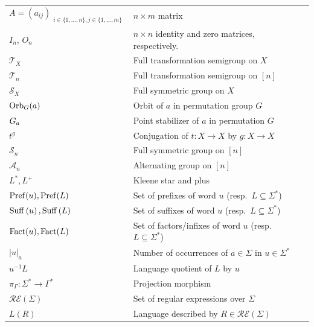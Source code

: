 \begin{longtable}{p{} p{} p{}}
		$A = (a_{ij})_{\substack{i\in \{1,\ldots,n\}, j \in \{1, \ldots, m\}}}$ & $n \times m$ matrix & \pageref{def:matrix} \\	
	$I_n$, $O_n$ & $n \times n$ identity and zero matrices, respectively.  & \pageref{def:identitymtx} \\	
	    $\mathcal T_X$ & Full transformation semigroup on $X$ & \pageref{def:T_X}  \\
	  $\mathcal T_n$ & Full transformation semigroup on $[n]$ & \pageref{def:T_n} \\
	    $\mathcal S_X$ & Full symmetric group on $X$ & \pageref{def:S_X} \\
	$\Orbit{a}{G}$  & Orbit of $a$ in permutation group $G$      & \pageref{def:orbit} \\
	 $\Stab{a}{G}$   & Point stabilizer of $a$ in permutation $G$ & \pageref{def:stabilizer} \\
	$t^g$           & Conjugation of $t \colon X \to X$ by $g \colon X \to X$ & \pageref{def:conjugation} \\
		$\mathcal S_n$ & Full symmetric group on $[n]$ & \pageref{def:S_n} \\
		$\mathcal A_n$ & Alternating group on $[n]$ & \pageref{def:A_n}  \\
		$L^*, L^+$ & Kleene star and plus & \pageref{def:Kleenestar} \\
		$\pref{u}, \pref{L}$ & Set of prefixes of word $u$ (resp.~$L \subseteq \Sigma^*$) & \pageref{def:pref} \\
	$\suff{u}, \suff{L}$ & Set of suffixes of word $u$ (resp.~$L \subseteq \Sigma^*$) & \pageref{def:suff} \\
	$\fact{u}, \fact{L}$ & Set of factors/infixes of word $u$ (resp.~$L \subseteq \Sigma^*$) & \pageref{def:fact} \\
	$|u|_a$ & Number of occurrences of $a \in \Sigma$ in $u \in \Sigma^*$ & \pageref{def:occurrences_of_letters} \\ 
	$u^{-1}L$ & Language quotient of $L$ by $u$ & \pageref{def:quotient} \\
		$\pi_{\Gamma}\colon \Sigma^* \to \Gamma^*$ & Projection morphism & \pageref{def:projection} \\
		$\mathcal{RE}(\Sigma)$ & Set of regular expressions over $\Sigma$ & \pageref{def:RegSigma} \\
	$L(R)$                   & Language described by $R \in \mathcal{RE}(\Sigma)$ & \pageref{def:language_reg_ex} \\

\end{longtable}
